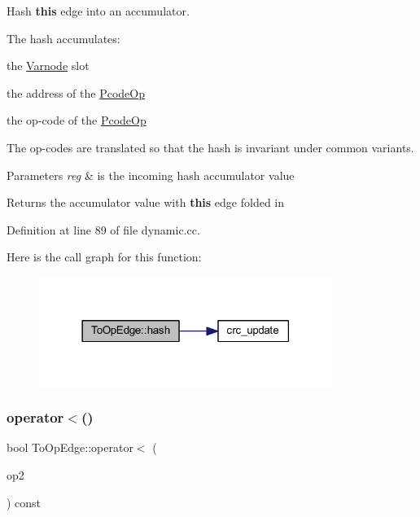 Hash {\bfseries{this}} edge into an accumulator. 

The hash accumulates\+:
\begin{DoxyItemize}
\item the \mbox{\hyperlink{class_varnode}{Varnode}} slot
\item the address of the \mbox{\hyperlink{class_pcode_op}{Pcode\+Op}}
\item the op-\/code of the \mbox{\hyperlink{class_pcode_op}{Pcode\+Op}}
\end{DoxyItemize}

The op-\/codes are translated so that the hash is invariant under common variants. 
\begin{DoxyParams}{Parameters}
{\em reg} & is the incoming hash accumulator value \\
\hline
\end{DoxyParams}
\begin{DoxyReturn}{Returns}
the accumulator value with {\bfseries{this}} edge folded in 
\end{DoxyReturn}


Definition at line 89 of file dynamic.\+cc.

Here is the call graph for this function\+:
\nopagebreak
\begin{figure}[H]
\begin{center}
\leavevmode
\includegraphics[width=270pt]{class_to_op_edge_a1a18d58e3a6b8686df271cf7911e35a2_cgraph}
\end{center}
\end{figure}
\mbox{\label{class_to_op_edge_ac11e6b4cd5c581a6297957e84f38cf2c}} 
\subsubsection{\texorpdfstring{operator$<$()}{operator<()}}
{\footnotesize\ttfamily bool To\+Op\+Edge\+::operator$<$ (\begin{DoxyParamCaption}\item[{const \mbox{\hyperlink{class_to_op_edge}{To\+Op\+Edge}} \&}]{op2 }\end{DoxyParamCaption}) const}



